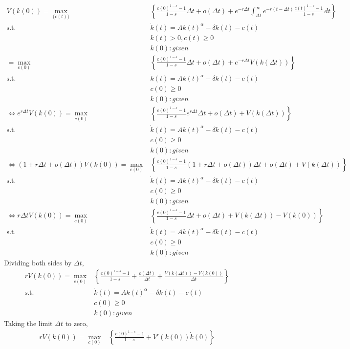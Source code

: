 \documentclass{article}
\begin{document}
\begin{CJK}{UTF8}{min}
\begin{align*}
V(k(0))=\max_{\{c(t)\}} \, &\left\{\frac{c(0)^{1-s}-1}{1-s}\Delta t+o(\Delta t)+e^{-r\Delta t}\int_{\Delta t} ^\infty e^{-r(t-\Delta t)}\frac{c(t)^{1-s}-1}{1-s}\,dt\right\}\\
\mathrm{s.t.} \,\,&\dot k(t)=Ak(t)^\alpha -\delta k(t)-c(t)\\
&k(t)>0,c(t)\geq0\\
&k(0):given\\
=\max_{c(0)}&\left\{\frac{c(0)^{1-s}-1}{1-s}\Delta t+o(\Delta t)+e^{-r\Delta t}V(k(\Delta t))\right\}\\
\mathrm{s.t.} \,\,&\dot k(t)=Ak(t)^\alpha -\delta k(t)-c(t)\\
&c(0)\geq0\\
&k(0):given\\
\Leftrightarrow e^{r\Delta t}V(k(0))=\max_{c(0)}&\left\{\frac{c(0)^{1-s}-1}{1-s}e^{r\Delta t}\Delta t+o(\Delta t)+V(k(\Delta t))\right\}\\
\mathrm{s.t.} \,\,&\dot k(t)=Ak(t)^\alpha -\delta k(t)-c(t)\\
&c(0)\geq0\\
&k(0):given\\
\Leftrightarrow(1+r\Delta t+o(\Delta t))V(k(0))=\max_{c(0)}&\left\{\frac{c(0)^{1-s}-1}{1-s}(1+r\Delta t+o(\Delta t))\Delta t+o(\Delta t)+V(k(\Delta t))\right\}\\
\mathrm{s.t.} \,\,&\dot k(t)=Ak(t)^\alpha -\delta k(t)-c(t)\\
&c(0)\geq0\\
&k(0):given\\
\Leftrightarrow r\Delta tV(k(0))=\max_{c(0)}&\left\{\frac{c(0)^{1-s}-1}{1-s}\Delta t+o(\Delta t)+V(k(\Delta t))-V(k(0))\right\}\\
\mathrm{s.t.} \,\,&\dot k(t)=Ak(t)^\alpha -\delta k(t)-c(t)\\
&c(0)\geq0\\
&k(0):given
\end{align*}
Dividing both sides by $\Delta t$,
\begin{align*}
rV(k(0))=\max_{c(0)}&\left\{\frac{c(0)^{1-s}-1}{1-s}+\frac{o(\Delta t)}{\Delta t}+\frac{V(k(\Delta t))-V(k(0))}{\Delta t}\right\}\\
\mathrm{s.t.} \,\,&\dot k(t)=Ak(t)^\alpha -\delta k(t)-c(t)\\
&c(0)\geq0\\
&k(0):given
\end{align*}
Taking the limit $\Delta t $ to zero,
\begin{align*}
rV(k(0))=\max_{c(0)}&\left\{\frac{c(0)^{1-s}-1}{1-s}+V'(k(0))\dot k(0)\right\}\\

\end{align*}
\end{CJK}
\end{document}
